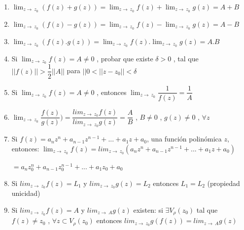 \documentclass[10pt,a4paper]{book}
\begin{document}
\begin{enumerate}
 \item $ \lim_{z\to\ z_0} (f(z) + g(z))=\lim_{z\to\ z_0} f(z) + \lim_{z\to\ z_0} g(z) = A + B$
 \item $ \lim_{z\to\ z_0} (f(z) - g(z))=\lim_{z\to\ z_0} f(z) - \lim_{z\to\ z_0} g(z) = A - B$
 \item $ \lim_{z\to\ z_0} (f(z).g(z))=\lim_{z\to\ z_0} f(z) . \lim_{z\to\ z_0} g(z) = A.B$
 \item Si $ \lim_{z\to\ z_0} f(z) = A \neq 0$ , probar que existe $\delta > 0$ , tal que $||f(z)|| > \dfrac{1}{2} ||A||$ para $||0<||z-z_0||<\delta$
 \item Si $ \lim_{z\to\ z_0} f(z) = A \neq 0$ , entonces $ \lim_{z\to\ z_0} \dfrac{1}{f(z)} = \dfrac{1}{A}$
 \item $ \lim_{z\to\ z_0} \dfrac{f(z)}{g(z)}) = \dfrac{lim_{z\to\ z_0} f(z)}{lim_{z\to\ z_0} g(z)} = \dfrac{A}{B}$ , $B\neq 0$ , $g(z) \neq 0$ , $\forall z$
 \item Si $f(z) = a_{n} z^{n} + a_{n-1} z^{n-1} + ... + a_{1} z + a_{0}$, una función polinómica $z$, entonces: 
 $\lim_{z\to\ z_0} f(z) =lim_{z\to\ z_0} (a_{n} z^{n} + a_{n-1} z^{n-1} + ... + a_{1} z + a_{0})$
 \begin{center}
  $=a_{n} z_{0}^{n} + a_{n-1} z_{0}^{n-1} + ... + a_{1} z_0 + a_{0}$
 \end{center}
 \item Si $lim_{z\to\ z_0} f(z) = L_1$ y $lim_{z\to\ z_0} g(z) = L_2$ entonces $L_1=L_2$ (propiedad unicidad)
 \item Si $lim_{z\to\ z_0} f(z) = A$ y $lim_{z\to\ A} g(z)$ existen: si $\exists V_\rho (z_0)$ tal que $f(z) \neq z_0$ , $\forall z \subset V_\rho (z_0)$ entonces $lim_{z\to\ z_0} g(f(z)) = lim_{z\to\ A}  g(z)$ 
  
\end{enumerate}
\end{document}

